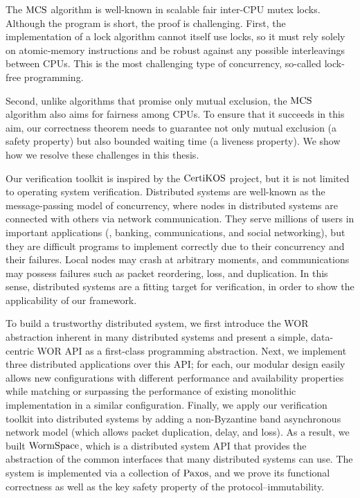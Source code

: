 The $\mathrm{MCS}$ algorithm is well-known in scalable fair inter-CPU mutex locks. 
Although the program is short, the proof is challenging. 
First, the implementation of a lock algorithm cannot itself use locks, so it must rely solely on atomic-memory instructions and be robust against any possible interleavings between CPUs. 
This is the most challenging type of concurrency, so-called lock-free programming. 

Second, unlike algorithms that promise only mutual exclusion, the $\mathrm{MCS}$ algorithm also aims for fairness among CPUs. 
To ensure that it succeeds in this aim, our correctness theorem needs to guarantee not only mutual exclusion (a safety property) but also bounded waiting time (a liveness property). 
We show how we resolve these challenges in this thesis. 

Our verification toolkit is inspired by the $\mathrm{CertiKOS}$ project, 
but it is not limited to operating system verification. 
Distributed systems are well-known as the message-passing model of concurrency, 
where nodes in distributed systems are connected with others via network communication. 
They serve millions of users in important applications (\ie, banking, communications, and social networking), 
but they are difficult programs to implement correctly due to their concurrency and their failures. 
Local nodes may crash at arbitrary moments, and communications may possess failures such as packet reordering, loss, and duplication. 
In this sense, distributed systems are a fitting target for verification, in order to show the applicability of our framework. 

To build a trustworthy distributed system, we first introduce the WOR abstraction inherent in many distributed systems and present a simple, 
data-centric WOR API as a first-class programming abstraction. 
Next, we implement three distributed applications over this API; for each, our modular design easily allows new configurations with different performance and availability properties while matching or surpassing the performance of existing monolithic implementation in a similar configuration. 
Finally, we apply our verification toolkit into distributed systems by adding a non-Byzantine band asynchronous network model (which allows packet duplication, delay, and loss). 
As a result, we built $\mathrm{WormSpace}$, which is a distributed system API that provides the abstraction of the common interfaces that many distributed systems can use. The system is implemented via a collection of $\mathrm{Paxos}$, and we prove its functional correctness as well as the key safety property of the protocol--immutability. 



